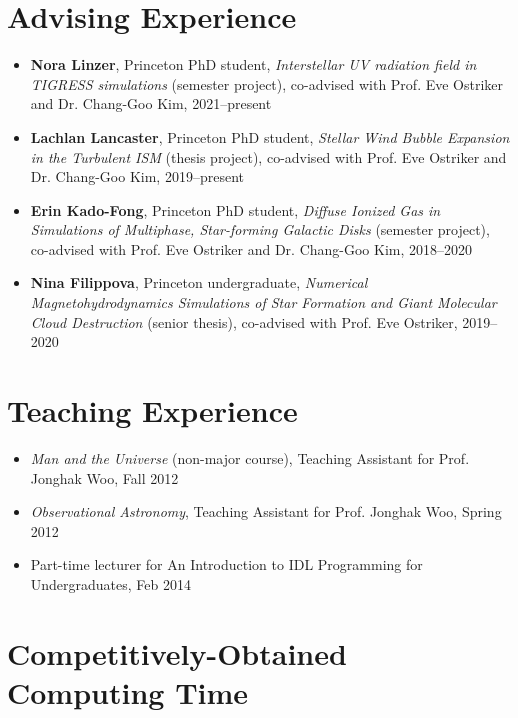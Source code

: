 \documentclass[11pt,letterpaper,roman]{moderncv}        %
\begin{document}
\section{Advising Experience}
\begin{itemize}
\setlength\itemsep{0.0em}
\item \textbf{Nora Linzer}, Princeton PhD student, \textit{Interstellar UV
    radiation field in TIGRESS simulations} (semester project), co-advised with
  Prof. Eve Ostriker and Dr. Chang-Goo Kim, 2021--present
\item \textbf{Lachlan Lancaster}, Princeton PhD student, \textit{Stellar Wind
    Bubble Expansion in the Turbulent ISM} (thesis project), co-advised with
  Prof. Eve Ostriker and Dr. Chang-Goo Kim, 2019--present
\item \textbf{Erin Kado-Fong}, Princeton PhD student, \textit{Diffuse Ionized Gas in
    Simulations of Multiphase, Star-forming Galactic Disks} (semester project),
  co-advised with Prof. Eve Ostriker and Dr. Chang-Goo Kim, 2018--2020
\item \textbf{Nina Filippova}, Princeton undergraduate, \textit{Numerical
    Magnetohydrodynamics Simulations of Star Formation and Giant Molecular Cloud
    Destruction} (senior thesis), co-advised with Prof. Eve Ostriker, 2019--2020
\end{itemize}

\section{Teaching Experience}
\begin{itemize}
\setlength\itemsep{0.0em}
\item \textit{Man and the Universe} (non-major course), Teaching
  Assistant for Prof. Jonghak Woo,  Fall 2012
\item \textit{Observational Astronomy}, Teaching Assistant for
  Prof. Jonghak Woo, Spring 2012
\item Part-time lecturer for {An Introduction to IDL Programming for Undergraduates}, Feb 2014
\end{itemize}

\section{Competitively-Obtained Computing Time}
\end{document}
